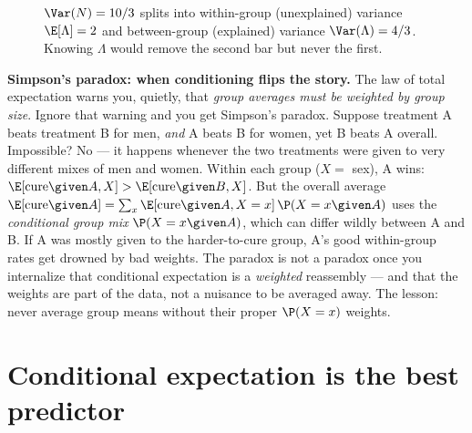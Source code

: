 \begin{figure}[H]
\centering
{}
\caption{$\Var(N) = 10/3$ splits into within-group (unexplained) variance $\E[\Lambda] = 2$ and
between-group (explained) variance $\Var(\Lambda) = 4/3$. Knowing $\Lambda$ would remove the second bar
but never the first.}
\label{ch15:fig-eve}
\end{figure}

\begin{paradoxbox}
\textbf{Simpson's paradox: when conditioning flips the story.} The law of total expectation warns you, quietly, that \emph{group averages must be weighted by group
size}. Ignore that warning and you get Simpson's paradox. Suppose treatment A beats treatment B for
men, \emph{and} A beats B for women, yet B beats A overall. Impossible? No --- it happens whenever the
two treatments were given to very different mixes of men and women. Within each group ($X = $ sex), A
wins: $\E[\text{cure}\given A, X] > \E[\text{cure}\given B, X]$. But the overall average
$\E[\text{cure}\given A] = \sum_x \E[\text{cure}\given A, X=x]\,\P(X=x\given A)$ uses the
\emph{conditional group mix} $\P(X = x \given A)$, which can differ wildly between A and B. If A was
mostly given to the harder-to-cure group, A's good within-group rates get drowned by bad weights. The
paradox is not a paradox once you internalize that conditional expectation is a \emph{weighted}
reassembly --- and that the weights are part of the data, not a nuisance to be averaged away. The
lesson: never average group means without their proper $\P(X = x)$ weights.
\end{paradoxbox}

\section{Conditional expectation is the best predictor}
\label{ch15:best-predictor}

